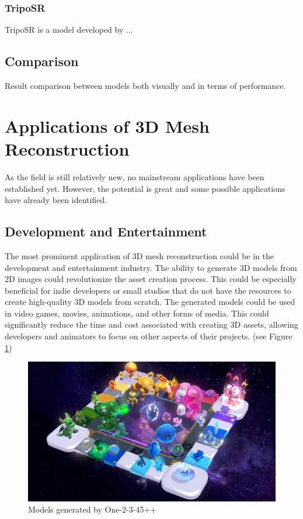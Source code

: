 \subsubsection{TripoSR}
TripoSR is a model developed by \textcite{tochilkin_triposr_2024}...

\subsection{Comparison}
Result comparison between models both visually and in terms of performance.

\section{Applications of 3D Mesh Reconstruction}
As the field is still relatively new, no mainstream applications have been established yet. However, the potential is great and some possible applications have already been identified.

\subsection{Development and Entertainment}
The most prominent application of 3D mesh reconstruction could be in the development and entertainment industry. The ability to generate 3D models from 2D images could revolutionize the asset creation process.
This could be especially beneficial for indie developers or small studios that do not have the resources to create high-quality 3D models from scratch. The generated models could be used in video games, movies, animations, and other forms of media. This could significantly reduce the time and cost associated with creating 3D assets, allowing developers and animators to focus on other aspects of their projects. (see Figure \ref{fig:one-2-3-4-5-plus-plus-demo})
\begin{figure}
    \centering
    \includegraphics[width=1\linewidth]{images/one-2-3-45++_demo.jpg}
    \caption{Models generated by One-2-3-45++ \autocite{liu_one-2-3-45_2023-1}}
    \label{fig:one-2-3-4-5-plus-plus-demo}
\end{figure}

